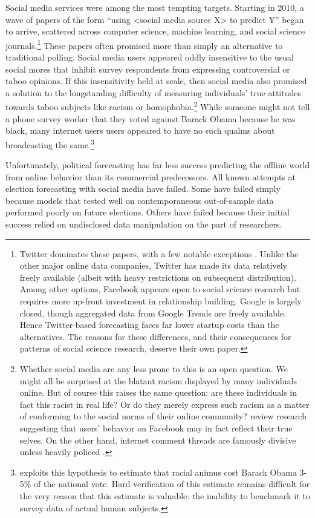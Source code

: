 \documentclass{article}
\begin{document}
Social media services were among the most tempting
targets. Starting in 2010, a wave of papers of the form ``using
<social media source X> to predict Y'' began to
arrive, scattered across computer science, machine learning, and
social science journals.\footnote{Twitter dominates these papers, with a few notable
  exceptions \citep{bond201261,broockman2013online}. Unlike the other major online data companies, Twitter has made
  its data relatively freely available (albeit with heavy restrictions
  on subsequent distribution). Among other options, Facebook appears open to
  social science research but requires more up-front investment in
  relationship building. Google is largely closed, though aggregated
  data from Google Trends are freely available. Hence Twitter-based
  forecasting faces far lower startup costs than the alternatives. The reasons for these
  differences, and their consequences for patterns of social science
  research, deserve their own paper.}
These papers often promised more than simply an
alternative to traditional polling. Social media users appeared oddly
insensitive to the usual social mores that inhibit survey respondents from expressing
controversial or taboo opinions. If this insensitivity held at scale, then social
media also promised a solution to the longstanding
difficulty of measuring individuals' true attitudes towards taboo
subjects like racism or homophobia.\footnote{Whether social media are any less prone to this
is an open question. We might all be surprised at the blatant racism
displayed by many individuals online. But of course this raises the
same question: are these individuals in fact this racist in real life?
Or do they merely express such racism as a matter of conforming to the
social norms of their online community? \cite{wilson2012review}
review research suggesting that users' behavior on Facebook may in
fact reflect their true selves. On the other hand, internet comment
threads are famously divisive unless heavily policed \citep{binns2012don}.}  While someone might not tell a phone survey worker that they
voted against Barack Obama because he was black, many internet users
users appeared to have no such qualms about broadcasting the
same.\footnote{\cite{stephens2013cost} exploits this hypothesis to
  estimate that racial animus cost Barack Obama 3-5\% of the national
  vote. Hard verification of this estimate remains difficult for the
  very reason that this estimate is valuable: the inability to
  benchmark it to survey data of actual human subjects.}

Unfortunately, political forecasting has far less success predicting
the offline world from online behavior than its commercial
predecessors. All known attempts at election forecasting with social
media have failed. Some have failed simply because models that tested
well on contemporaneous out-of-sample data performed poorly on future
elections. Others have failed because their initial success relied on
undisclosed data manipulation on the part of researchers.
\end{document}
